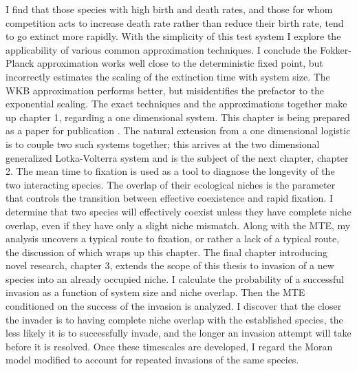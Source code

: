 I find that those species with high birth and death rates, and those for whom competition acts to increase death rate rather than reduce their birth rate, tend to go extinct more rapidly. %
With the simplicity of this test system I explore the applicability of various common approximation techniques. 
I conclude the Fokker-Planck approximation works well close to the deterministic fixed point, but incorrectly estimates the scaling of the extinction time with system size. The WKB approximation performs better, but misidentifies the prefactor to the exponential scaling. %
The exact techniques and the approximations together make up chapter 1, regarding a one dimensional system. %
This chapter is being prepared as a paper for publication \cite{Badali2018a}. 
The natural extension from a one dimensional logistic is to couple two such systems together; this arrives at the two dimensional generalized Lotka-Volterra system and is the subject of the next chapter, chapter 2. %
The mean time to fixation is used as a tool to diagnose the longevity of the two interacting species. 
The overlap of their ecological niches is the parameter that controls the transition between effective coexistence and rapid fixation. 
I determine that two species will effectively coexist unless they have complete niche overlap, even if they have only a slight niche mismatch. %
Along with the MTE, my analysis uncovers a typical route to fixation, or rather a lack of a typical route, the discussion of which wraps up this chapter. %
The final chapter introducing novel research, chapter 3, extends the scope of this thesis to invasion of a new species into an already occupied niche. %
I calculate the probability of a successful invasion as a function of system size and niche overlap. 
Then the MTE conditioned on the success of the invasion is analyzed. 
I discover that the closer the invader is to having complete niche overlap with the established species, the less likely it is to successfully invade, and the longer an invasion attempt will take before it is resolved. %
Once these timescales are developed, I regard the Moran model modified to account for repeated invasions of the same species. 
